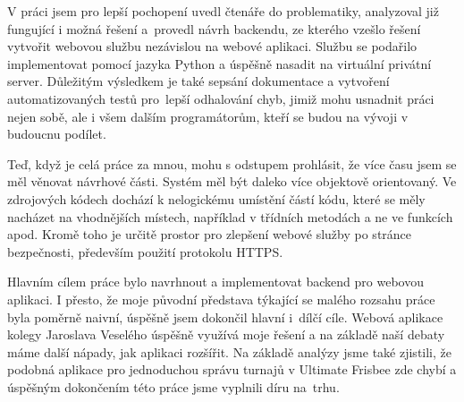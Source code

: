 \begin{conclusion}
  V práci jsem pro lepší pochopení uvedl čtenáře do problematiky, analyzoval již fungující i možná řešení
  a~provedl návrh backendu, ze kterého vzešlo řešení vytvořit webovou službu nezávislou na webové aplikaci.
  Službu se podařilo implementovat pomocí jazyka Python a úspěšně nasadit na virtuální privátní server.
  Důležitým výsledkem je také sepsání dokumentace a vytvoření automatizovaných testů pro~lepší odhalování chyb,
  jimiž mohu usnadnit práci nejen sobě, ale i všem dalším programátorům, kteří se budou na vývoji v budoucnu podílet. %
  
  Teď, když je celá práce za mnou, mohu s odstupem prohlásit, že více času jsem se měl věnovat návrhové části.
  Systém měl být daleko více objektově orientovaný. Ve zdrojových kódech dochází k nelogickému umístění částí kódu,
  které se měly nacházet na vhodnějších místech, například v třídních metodách a ne ve funkcích apod.
  Kromě toho je určitě prostor pro zlepšení webové služby po stránce bezpečnosti, především použití protokolu HTTPS.
  
  Hlavním cílem práce bylo navrhnout a implementovat backend pro webovou aplikaci. I přesto, že moje původní představa
  týkající se malého rozsahu práce byla poměrně naivní, úspěšně jsem dokončil hlavní i~dílčí cíle. Webová aplikace kolegy Jaroslava Veselého
  úspěšně využívá moje řešení a na základě naší debaty máme další nápady, jak aplikaci rozšířit. Na základě analýzy jsme také zjistili,
  že podobná aplikace pro jednoduchou správu turnajů v Ultimate Frisbee zde chybí a úspěšným dokončením této práce jsme vyplnili díru na~trhu.  
\end{conclusion}